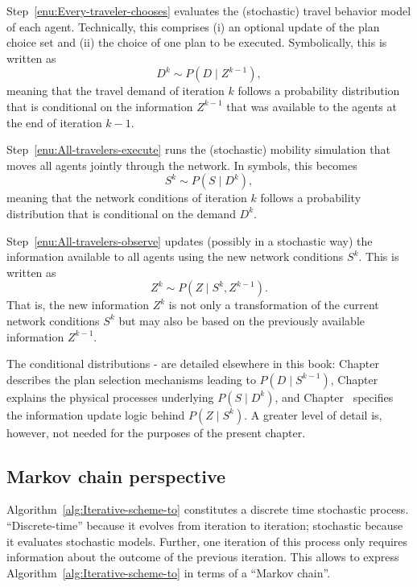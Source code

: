 Step~\ref{enu:Every-traveler-chooses} evaluates the (stochastic)
travel behavior model of each agent. Technically, this comprises (i)
an optional update of the plan choice set and (ii) the choice of one
plan to be executed. Symbolically, this is written as
\begin{equation}
D^{k}\sim P(D\mid Z^{k-1}),\label{eq:choice-model}
\end{equation}
meaning that the travel demand of iteration $k$ follows a probability
distribution that is conditional on the information $Z^{k-1}$ that
was available to the agents at the end of iteration $k-1$.

Step~\ref{enu:All-travelers-execute} runs the (stochastic) mobility
simulation that moves all agents jointly through the network. In symbols,
this becomes
\begin{equation}
S^{k}\sim P(S\mid D^{k}),\label{eq:network-loading-model}
\end{equation}
meaning that the network conditions of iteration $k$ follows a probability
distribution that is conditional on the demand $D^{k}$. 

Step~\ref{enu:All-travelers-observe} updates (possibly in a stochastic
way) the information available to all agents using the new network
conditions $S^{k}$. This is written as
\begin{equation}
Z^{k}\sim P(Z\mid S^{k},Z^{k-1}).\label{eq:learning-model}
\end{equation}
That is, the new information $Z^{k}$ is not only a transformation
of the current network conditions $S^{k}$ but may also be based on
the previously available information $Z^{k-1}$.

The conditional distributions -
are detailed elsewhere in this book: Chapter~
describes the plan selection mechanisms leading to $P(D\mid S^{k-1})$,
Chapter~ explains the physical processes underlying
$P(S\mid D^{k})$, and Chapter~ specifies the information
update logic behind $P(Z\mid S^{k})$. A greater level of detail is,
however, not needed for the purposes of the present chapter.


\subsection{\label{sub:Markov-chain-perspective}Markov chain perspective}

Algorithm~\ref{alg:Iterative-scheme-to} constitutes a discrete time
stochastic process. {}``Discrete-time'' because it evolves from
iteration to iteration; stochastic because it evaluates stochastic
models. Further, one iteration of this process only requires information
about the outcome of the previous iteration. This allows to express
Algorithm~\ref{alg:Iterative-scheme-to} in terms of a {}``Markov
chain''. 

